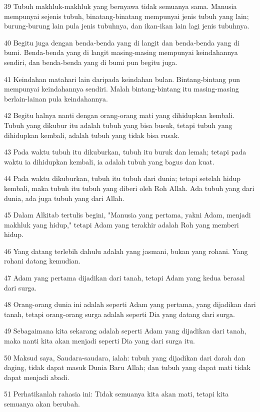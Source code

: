 \par 39 Tubuh makhluk-makhluk yang bernyawa tidak semuanya sama. Manusia mempunyai sejenis tubuh, binatang-binatang mempunyai jenis tubuh yang lain; burung-burung lain pula jenis tubuhnya, dan ikan-ikan lain lagi jenis tubuhnya.
\par 40 Begitu juga dengan benda-benda yang di langit dan benda-benda yang di bumi. Benda-benda yang di langit masing-masing mempunyai keindahannya sendiri, dan benda-benda yang di bumi pun begitu juga.
\par 41 Keindahan matahari lain daripada keindahan bulan. Bintang-bintang pun mempunyai keindahannya sendiri. Malah bintang-bintang itu masing-masing berlain-lainan pula keindahannya.
\par 42 Begitu halnya nanti dengan orang-orang mati yang dihidupkan kembali. Tubuh yang dikubur itu adalah tubuh yang bisa busuk, tetapi tubuh yang dihidupkan kembali, adalah tubuh yang tidak bisa rusak.
\par 43 Pada waktu tubuh itu dikuburkan, tubuh itu buruk dan lemah; tetapi pada waktu ia dihidupkan kembali, ia adalah tubuh yang bagus dan kuat.
\par 44 Pada waktu dikuburkan, tubuh itu tubuh dari dunia; tetapi setelah hidup kembali, maka tubuh itu tubuh yang diberi oleh Roh Allah. Ada tubuh yang dari dunia, ada juga tubuh yang dari Allah.
\par 45 Dalam Alkitab tertulis begini, "Manusia yang pertama, yakni Adam, menjadi makhluk yang hidup," tetapi Adam yang terakhir adalah Roh yang memberi hidup.
\par 46 Yang datang terlebih dahulu adalah yang jasmani, bukan yang rohani. Yang rohani datang kemudian.
\par 47 Adam yang pertama dijadikan dari tanah, tetapi Adam yang kedua berasal dari surga.
\par 48 Orang-orang dunia ini adalah seperti Adam yang pertama, yang dijadikan dari tanah, tetapi orang-orang surga adalah seperti Dia yang datang dari surga.
\par 49 Sebagaimana kita sekarang adalah seperti Adam yang dijadikan dari tanah, maka nanti kita akan menjadi seperti Dia yang dari surga itu.
\par 50 Maksud saya, Saudara-saudara, ialah: tubuh yang dijadikan dari darah dan daging, tidak dapat masuk Dunia Baru Allah; dan tubuh yang dapat mati tidak dapat menjadi abadi.
\par 51 Perhatikanlah rahasia ini: Tidak semuanya kita akan mati, tetapi kita semuanya akan berubah.

